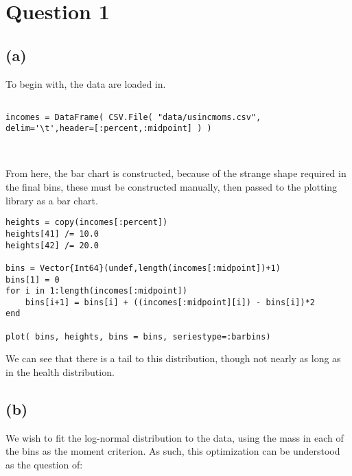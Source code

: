 \documentclass[12pt]{paper}
\begin{document}
\section{Question 1}

\subsection{(a)}


To begin with, the data are loaded in.

\begin{verbatim}

incomes = DataFrame( CSV.File( "data/usincmoms.csv", delim='\t',header=[:percent,:midpoint] ) )

  
\end{verbatim}



From here, the bar chart is constructed, because of the strange shape
required in the final bins, these must be constructed manually, then
passed to the plotting library as a bar chart.



\begin{verbatim}
heights = copy(incomes[:percent])
heights[41] /= 10.0
heights[42] /= 20.0

bins = Vector{Int64}(undef,length(incomes[:midpoint])+1)
bins[1] = 0
for i in 1:length(incomes[:midpoint])
    bins[i+1] = bins[i] + ((incomes[:midpoint][i]) - bins[i])*2
end

plot( bins, heights, bins = bins, seriestype=:barbins)
\end{verbatim}


We can see that there is a tail to this distribution, though not
nearly as long as in the health distribution.

\subsection{(b)}

We wish to fit the log-normal distribution to the data, using the mass
in each of the bins as the moment criterion. As such, this
optimization can be understood as the question of:
\end{document}
